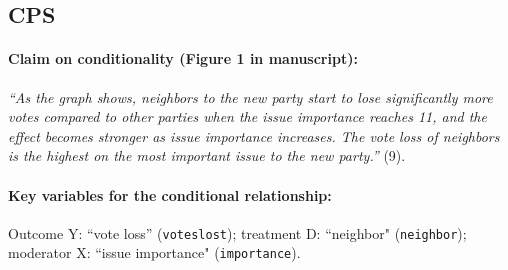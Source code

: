 \documentclass[12pt]{article}
\begin{document}
\clearpage



\subsection{\citet{Tavits2008} CPS} \label{tavits}



\paragraph{Claim on conditionality (Figure 1 in manuscript):} \emph{``As the graph shows, neighbors to the new party start to lose significantly more votes compared to other parties when the issue importance reaches 11, and the effect becomes stronger as issue importance increases. The vote loss of neighbors is the highest on the most important issue to the new party.''} (9). 

\paragraph{Key variables for the conditional relationship:} Outcome Y:
``vote loss'' (\texttt{voteslost}); treatment D: ``neighbor" (\texttt{neighbor}); moderator X: ``issue importance"
(\texttt{importance}).


\newpage
\end{document}
